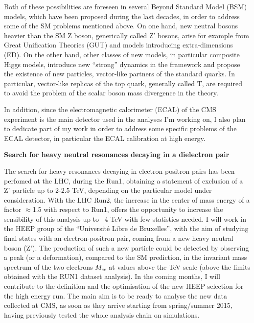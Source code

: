 \documentclass[a4paper,11pt]{article}
\begin{document}
Both of these possibilities are foreseen in several Beyond Standard Model (BSM) models, which have been proposed during the last decades, in order to 
 address some of the SM problems mentioned above.
On one hand, new neutral bosons heavier than the SM Z boson, generically called Z' bosons, arise for example from Great Unification Theories (GUT) 
and models introducing extra-dimensions (ED). %
\newline
On the other hand, other classes of new models, in particular composite Higgs models,  %
introduce new ``strong'' dynamics in the framework and propose the existence of new particles, vector-like partners of the standard quarks.
In particular, vector-like replicas of the top quark, generally called T, are required to avoid the problem of the scalar boson mass divergence in the theory.

\smallskip
In addition, since the electromagnetic calorimeter (ECAL) of the CMS experiment is the main detector used in the analyses I'm working on,
I also plan to dedicate part of my work in order to address some specific problems of the ECAL detector, in particular the ECAL calibration at high energy.

\medskip
\large{\textbf{Search for heavy neutral resonances decaying in a dielectron pair}}

\smallskip
The search for heavy resonances decaying in electron-positron pairs has been perfomed at the LHC, during the Run1, obtaining a statement of exclusion of
a Z' particle up to 2-2.5 TeV, depending on the particular model under consideration.
With the LHC Run2, the increase in the center of mass energy of a factor $\approx$1.5 with respect to Run1, offers the opportunity to increase the sensibility 
of this analysis up to ~4 TeV with few statistics needed.
I will work in the HEEP group of the ``Université Libre de Bruxelles'', with the aim of studying final states with an electron-positron pair, 
coming from a new heavy neutral boson (Z'). The production of such a new particle could be detected by observing a peak (or a deformation),
compared to the SM prediction, in the invariant mass spectrum of the two electrons $M_{ee}$ at values above the TeV scale (above the limits obtained 
with the RUN1 dataset analysis).
In the coming months, I will contribute to the definition and the optimisation of the new HEEP selection for the high energy run.
The main aim is to be ready to analyse the new data collected at CMS, as soon as they arrive starting from spring/summer 2015, having previously tested 
the whole analysis chain on simulations. 
\end{document}
